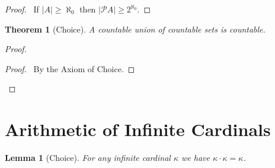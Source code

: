\documentclass{article}
\let\qed\relax
\newtheorem{lemma}[axiom]{Lemma}
\newtheorem{theorem}[axiom]{Theorem}
\theoremstyle{definition}
\begin{document}
    \begin{proof}
        \pf\ If $|A| \geq \aleph_0$ then $|\mathcal{P} A| \geq 2^{\aleph_0}$. \qed
    \end{proof}

    \begin{theorem}[Choice]
        A countable union of countable sets is countable.
    \end{theorem}

    \begin{proof}
        \pf
        \begin{proof}
            \pf\ By the Axiom of Choice.
        \end{proof}
        \qed
    \end{proof}
    
    \section{Arithmetic of Infinite Cardinals}

    \begin{lemma}[Choice]
        For any infinite cardinal $\kappa$ we have $\kappa \cdot \kappa = \kappa$.
    \end{lemma}
\end{document}
